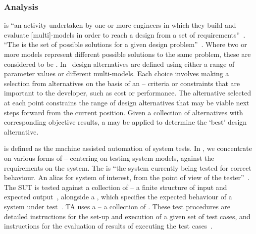 \subsubsection{Analysis}
\label{sec:concepts:analysis}

 is ``an activity undertaken by one or more engineers in which they build and evaluate [multi]-models in order to reach a design from a set of requirements''~\cite{Broenink&12b}. ``The  is the set of possible solutions for a given design problem''~\cite{Broenink&12b}. Where two or more models represent different possible solutions to the same problem, these are considered to be . In \into\, design alternatives are defined using either a range of parameter values or different multi-models. Each choice involves making a selection from alternatives on the basis of an  -- criteria or constraints that are important to the developer, such as cost or performance. The alternative selected at each point constrains the range of design alternatives that may be viable next steps forward from the current position. Given a collection of alternatives with corresponding objective results, a  may be applied to determine the `best' design alternative.

 is defined as the machine assisted automation of system tests. In \into, we concentrate on various forms of  -- centering on testing system models, against the requirements on the system. The  is ``the system currently being tested for correct behaviour. An alias for system of interest, from the point of view of the tester''~\cite{Holt&14}. The SUT is tested against a collection of  --  a finite structure of input and expected output~\cite{Utting&06}, alongside a , which specifies the expected behaviour of a system under test~\cite{Coleman&13b}. TA uses a  -- a collection of . These test procedures are detailed instructions for the set-up and execution of a given set of test cases, and instructions for the evaluation of results of executing the test cases~\cite{DO178B}.

